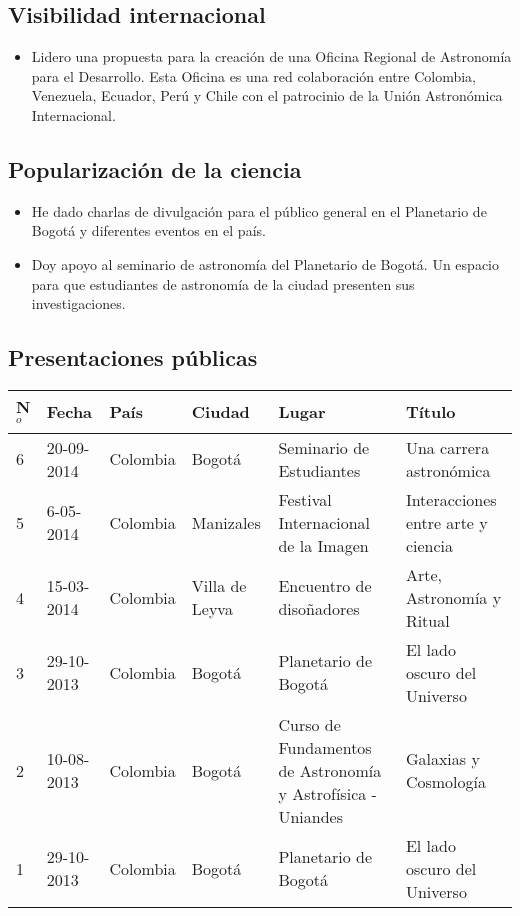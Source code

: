 \documentclass{article}
\begin{document}
\subsection{Visibilidad internacional}
\begin{itemize}
\item {Lidero una propuesta para la creaci\'on de una Oficina Regional
  de Astronom\'ia para el Desarrollo. Esta Oficina es una red
  colaboraci\'on entre Colombia, Venezuela, Ecuador, Per\'u y Chile
  con el patrocinio de la Uni\'on Astron\'omica Internacional.}  
\end{itemize}

\subsection{Popularizaci\'on de la ciencia}
\begin{itemize}
\item {He dado charlas de divulgaci\'on para el p\'ublico general en
  el Planetario de Bogot\'a y diferentes eventos en el pa\'is.} 
\item {Doy apoyo al seminario de astronom\'ia del Planetario de
  Bogot\'a. Un espacio para que estudiantes de astronom\'ia de la
  ciudad presenten sus investigaciones.}  
\end{itemize}

\subsection{Presentaciones p\'ublicas}

\begin{tabular}{l l l l p{3cm} p{4cm}}\hline
N$^{o}$ & Fecha & Pa\'is & Ciudad & Lugar & T\'itulo\\\hline
6 & 20-09-2014 & Colombia & Bogot\'a & Seminario de Estudiantes & Una
carrera astron\'omica \\ \hline
5 & 6-05-2014 & Colombia & Manizales & Festival Internacional de la
Imagen & Interacciones entre arte y ciencia\\ \hline
4 & 15-03-2014  & Colombia & Villa de Leyva & Encuentro de
diso\~nadores & Arte, Astronomía y Ritual \\ \hline
3 & 29-10-2013 & Colombia & Bogot\'a & Planetario de Bogot\'a & El
lado oscuro del Universo\\ \hline 
2 & 10-08-2013 & Colombia & Bogot\'a & Curso de Fundamentos de
Astronom\'ia y Astrof\'isica - Uniandes & Galaxias y
Cosmolog\'ia\\    \hline
1 & 29-10-2013 & Colombia & Bogot\'a & Planetario de Bogot\'a & El
lado oscuro del Universo\\ \hline 
\end{tabular}
\end{document}

